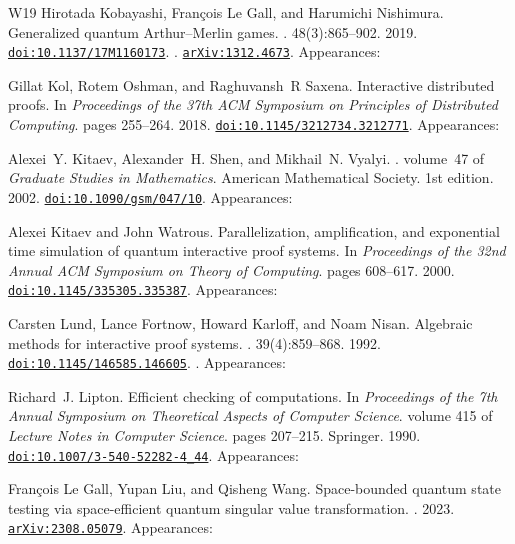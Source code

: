 \documentclass[10pt,a4paper]{article}
\numberwithin{equation}{section}
\numberwithin{figure}{section}
\begin{document}
\begin{thebibliography}{{}W19}
Hirotada Kobayashi, François {Le Gall}, and Harumichi Nishimura.
\newblock Generalized quantum {Arthur--Merlin} games.
. 48(3):865--902. 2019.
\newblock \href {https://doi.org/10.1137/17M1160173} {\texttt{doi:10.1137/17M1160173}}. . \href {https://arxiv.org/abs/1312.4673} {\texttt{arXiv:1312.4673}}. Appearances:\!

Gillat Kol, Rotem Oshman, and Raghuvansh~R Saxena.
\newblock Interactive distributed proofs.
\newblock In {\em Proceedings of the 37th ACM Symposium on Principles of Distributed Computing}. pages 255--264. 2018.
\newblock \href {https://doi.org/10.1145/3212734.3212771} {\texttt{doi:10.1145/3212734.3212771}}. Appearances:\!

Alexei~Y. Kitaev, Alexander~H. Shen, and Mikhail~N. Vyalyi.
. volume~47 of {\em Graduate Studies in Mathematics}.
\newblock American Mathematical Society. 1st edition. 2002.
\newblock \href {https://doi.org/10.1090/gsm/047/10} {\texttt{doi:10.1090/gsm/047/10}}. Appearances:\!

Alexei Kitaev and John Watrous.
\newblock Parallelization, amplification, and exponential time simulation of quantum interactive proof systems.
\newblock In {\em Proceedings of the 32nd Annual ACM Symposium on Theory of Computing}. pages 608--617. 2000.
\newblock \href {https://doi.org/10.1145/335305.335387} {\texttt{doi:10.1145/335305.335387}}. Appearances:\!

Carsten Lund, Lance Fortnow, Howard Karloff, and Noam Nisan.
\newblock Algebraic methods for interactive proof systems.
. 39(4):859--868. 1992.
\newblock \href {https://doi.org/10.1145/146585.146605} {\texttt{doi:10.1145/146585.146605}}. . Appearances:\!

Richard~J. Lipton.
\newblock Efficient checking of computations.
\newblock In {\em Proceedings of the 7th Annual Symposium on Theoretical Aspects of Computer Science}. volume 415 of {\em Lecture Notes in Computer Science}. pages 207--215. Springer. 1990.
\newblock \href {https://doi.org/10.1007/3-540-52282-4\_44} {\texttt{doi:10.1007/3-540-52282-4\_44}}. Appearances:\!

Fran{\c{c}}ois {Le Gall}, Yupan Liu, and Qisheng Wang.
\newblock Space-bounded quantum state testing via space-efficient quantum singular value transformation.
. 2023.
\newblock \href {https://arxiv.org/abs/2308.05079} {\texttt{arXiv:2308.05079}}. Appearances:\!


\end{thebibliography}
\end{document}
